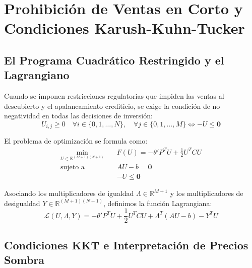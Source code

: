 \documentclass[11pt,a4paper]{report}
\numberwithin{equation}{chapter}
\begin{document}
\chapter{Prohibición de Ventas en Corto y Condiciones Karush-Kuhn-Tucker}

\section{El Programa Cuadrático Restringido y el Lagrangiano}

Cuando se imponen restricciones regulatorias que impiden las ventas al descubierto y el apalancamiento crediticio, se exige la condición de no negatividad en todas las decisiones de inversión:
\begin{equation}
    U_{i,j} \ge 0 \quad \forall i \in \{0, 1, \dots, N\}, \quad \forall j \in \{0, 1, \dots, M\} \iff -U \le \mathbf{0}
\end{equation}

El problema de optimización se formula como:
\begin{equation}
\begin{aligned}
    \min_{U \in \mathbb{R}^{(M+1)(N+1)}} \quad & F(U) = -\theta' P^T U + \frac{1}{2} U^T C U \\
    \text{sujeto a} \quad & AU - b = \mathbf{0} \\
    & -U \le \mathbf{0}
\end{aligned}
\end{equation}

Asociando los multiplicadores de igualdad $\Lambda \in \mathbb{R}^{M+1}$ y los multiplicadores de desigualdad $Y \in \mathbb{R}^{(M+1)(N+1)}$, definimos la función Lagrangiana:
\begin{equation}
    \mathcal{L}(U, \Lambda, Y) = -\theta' P^T U + \frac{1}{2} U^T C U + \Lambda^T (AU - b) - Y^T U
\end{equation}

\section{Condiciones KKT e Interpretación de Precios Sombra}
\end{document}
